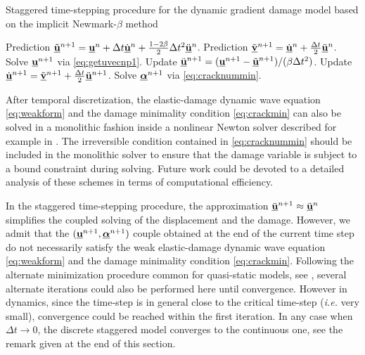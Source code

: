 \begin{algorithm}[htbp]
\caption{Staggered time-stepping procedure for the dynamic gradient damage model based on the implicit Newmark-$\beta$ method} \label{algo:implicit}
\begin{algorithmic}[1]\linespread{1.2}\selectfont\normalsize
{}
  \State Prediction $\tilde{\uvec}^{n+1}=\uvec^n+\Delta t\dot{\uvec}^n+\frac{1-2\beta}{2}\Delta t^2\ddot{\uvec}^n$.
  \State Prediction $\tilde{\underline{\vec{v}}}^{n+1}=\dot{\uvec}^n+\frac{\Delta t}{2}\ddot{\uvec}^n$.
  \State Solve $\uvec^{n+1}$ via \eqref{eq:getuvecnp1}.
  \State Update $\ddot{\uvec}^{n+1}=(\uvec^{n+1}-\tilde{\uvec}^{n+1})/(\beta\Delta t^2)$.
  \State Update $\dot{\uvec}^{n+1}=\tilde{\underline{\vec{v}}}^{n+1}+\frac{\Delta t}{2}\ddot{\uvec}^{n+1}$.
  \State Solve $\dvec^{n+1}$ via \eqref{eq:cracknummin}.
\EndFor
\end{algorithmic}
\end{algorithm}

\begin{remark}
After temporal discretization, the elastic-damage dynamic wave equation \eqref{eq:weakform} and the damage minimality condition \eqref{eq:crackmin} can also be solved in a monolithic fashion inside a nonlinear Newton solver described for example in \cite{BordenVerhooselScottHughesLandis:2012,SchlueterWillenbuecherKuhnMueller:2014}. The irreversible condition contained in \eqref{eq:cracknummin} should be included in the monolithic solver to ensure that the damage variable is subject to a bound constraint during solving. Future work could be devoted to a detailed analysis of these schemes in terms of computational efficiency.
\end{remark}

\begin{remark}
In the staggered time-stepping procedure, the approximation $\ddot{\uvec}^{n+1}\approx\ddot{\uvec}^{n}$ simplifies the coupled solving of the displacement and the damage. However, we admit that the $(\uvec^{n+1},\dvec^{n+1})$ couple obtained at the end of the current time step do not necessarily satisfy the weak elastic-damage dynamic wave equation \eqref{eq:weakform} and the damage minimality condition \eqref{eq:crackmin}. Following the alternate minimization procedure common for quasi-static models, see \cite{PhamAmorMarigoMaurini:2011}, several alternate iterations could also be performed here until convergence. However in dynamics, since the time-step is in general close to the critical time-step (\emph{i.e.} very small), convergence could be reached within the first iteration. In any case when $\Delta t\to 0$, the discrete staggered model converges to the continuous one, see the remark given at the end of this section.
\end{remark}


